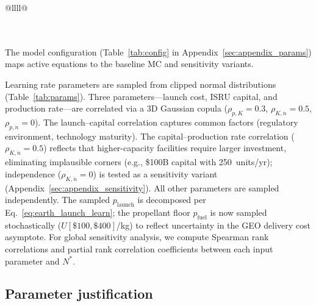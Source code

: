\documentclass[preprint,12pt]{elsarticle}
\begin{document}
\begin{table}[htbp]
{\begin{tabular}{@{}llll@{}}
 \\
 \\
 \\
\end{tabular}}
\end{table}

The model configuration (Table~\ref{tab:config} in Appendix~\ref{sec:appendix_params}) maps active equations to the baseline MC and sensitivity variants.

Learning rate parameters are sampled from clipped normal distributions (Table~\ref{tab:params}). Three parameters---launch cost, ISRU capital, and production rate---are correlated via a 3D Gaussian copula ($\rho_{p,K} = 0.3$, $\rho_{K,\dot{n}} = 0.5$, $\rho_{p,\dot{n}} = 0$). The launch--capital correlation captures common factors (regulatory environment, technology maturity). The capital--production rate correlation ($\rho_{K,\dot{n}} = 0.5$) reflects that higher-capacity facilities require larger investment, eliminating implausible corners (e.g., \$100B capital with 250~units/yr); independence ($\rho_{K,\dot{n}} = 0$) is tested as a sensitivity variant (Appendix~\ref{sec:appendix_sensitivity}). All other parameters are sampled independently. The sampled $p_{\mathrm{launch}}$ is decomposed per Eq.~\ref{eq:earth_launch_learn}; the propellant floor $p_{\mathrm{fuel}}$ is now sampled stochastically ($U[\$100, \$400]$/kg) to reflect uncertainty in the GEO delivery cost asymptote. For global sensitivity analysis, we compute Spearman rank correlations and partial rank correlation coefficients between each input parameter and $N^*$.

\subsection{Parameter justification}
\label{sec:param_justification}
\end{document}
